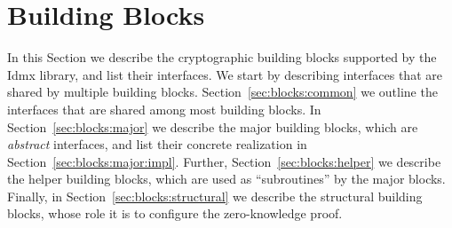 
\section{Building Blocks}

In this Section we describe the cryptographic building blocks supported
by the Idmx library, and list their interfaces.
We start by describing interfaces that are shared by
multiple building blocks. 
Section~\ref{sec:blocks:common} we outline the interfaces that are shared among most 
building blocks.
In Section~\ref{sec:blocks:major} we describe
the major building blocks, which are \emph{abstract} interfaces, and
list their concrete realization in Section~\ref{sec:blocks:major:impl}.
Further, Section~\ref{sec:blocks:helper} we describe
the helper building blocks, which are used as ``subroutines'' by the major blocks.
Finally, in Section~\ref{sec:blocks:structural} we describe the structural
building blocks, whose role it is to configure the zero-knowledge proof.






